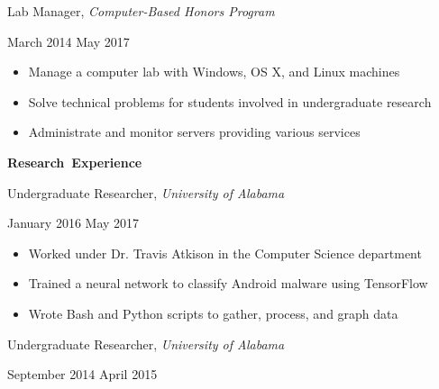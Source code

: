 \documentclass[11pt]{article}
\begin{document}
\begin{minipage}[t]{0.65\textwidth}
\flushleft
Lab Manager, \textit{Computer-Based Honors Program}\\
\end{minipage}
\begin{minipage}[t]{0.30\textwidth}
\flushright
March 2014 \space \textemdash \space May 2017\\
\end{minipage}

\begin{itemize}
  \item Manage a computer lab with Windows, OS X, and Linux machines
  \item Solve technical problems for students involved in undergraduate research
  \item Administrate and monitor servers providing various services
\end{itemize}

\vspace{0.8em}
\hbox{\large \textbf{Research Experience}}

\vspace{0.4em}
\begin{minipage}[t]{0.65\textwidth}
\flushleft
Undergraduate Researcher, \textit{University of Alabama}\\
\end{minipage}
\begin{minipage}[t]{0.30\textwidth}
\flushright
January 2016 \space \textemdash \space May 2017\\
\end{minipage}

\begin{itemize}
  \item Worked under Dr. Travis Atkison in the Computer Science department
  \item Trained a neural network to classify Android malware using TensorFlow
  \item Wrote Bash and Python scripts to gather, process, and graph data
\end{itemize}

\vspace{0.4em}
\begin{minipage}[t]{0.65\textwidth}
\flushleft
Undergraduate Researcher, \textit{University of Alabama}\\
\end{minipage}
\begin{minipage}[t]{0.30\textwidth}
\flushright
September 2014 \space \textemdash \space April 2015\\
\end{minipage}
\end{document}

